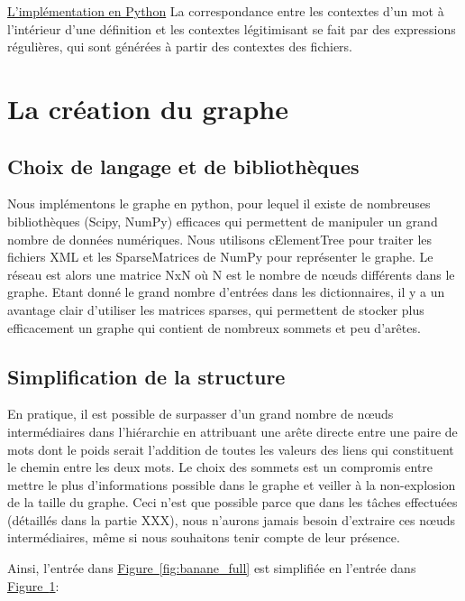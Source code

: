 \documentclass[a4paper, 12pt]{article}
\begin{document}
\underline{L'implémentation en Python}\newline
La correspondance entre les contextes d'un mot à l'intérieur d'une définition et les contextes légitimisant se fait par des expressions régulières, qui sont générées à partir des contextes des fichiers.

\section{La création du graphe}

\subsection{Choix de langage et de bibliothèques}
Nous implémentons le graphe en python, pour lequel il existe de nombreuses bibliothèques (Scipy, NumPy) efficaces qui permettent de manipuler un grand nombre de données numériques. Nous utilisons cElementTree pour traiter les fichiers XML et les SparseMatrices de NumPy pour représenter le graphe. Le réseau est alors une matrice NxN où N est le nombre de nœuds différents dans le graphe. Etant donné le grand nombre d'entrées dans les dictionnaires, il y a un avantage clair d'utiliser les matrices sparses, qui permettent de stocker plus efficacement un graphe qui contient de nombreux sommets et peu d'arêtes.

\subsection{Simplification de la structure}
En pratique, il est possible de surpasser d'un grand nombre de nœuds intermédiaires dans l'hiérarchie en attribuant une arête directe entre une paire de mots dont le poids serait l'addition de toutes les valeurs des liens qui constituent le chemin entre les deux mots. Le choix des sommets est un compromis entre mettre le plus d'informations possible dans le graphe et veiller à la non-explosion de la taille du graphe. Ceci n'est que possible parce que dans les tâches effectuées (détaillés dans la partie XXX), nous n'aurons jamais besoin d'extraire ces nœuds intermédiaires, même si nous souhaitons tenir compte de leur présence.

Ainsi, l'entrée dans \hyperref[fig:banane_full]{Figure~\ref*{fig:banane_full}} est simplifiée en l'entrée dans \hyperref[fig:banane_simple]{Figure~\ref*{fig:banane_simple}}:

\begin{figure}
\centering
\parbox{5cm}{
\def\svgscale{0.5}

\caption{}
\label{fig:banane_full}}
\qquad
\begin{minipage}{5cm}
\def\svgscale{0.5}

\caption{}
\label{fig:banane_simple}
\end{minipage}
\end{figure}
\end{document}
